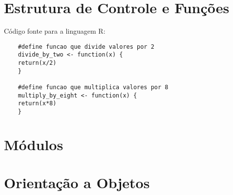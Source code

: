     \section{Estrutura de Controle e Fun\c{c}\~{o}es}
   C\'{o}digo fonte para a linguagem R:
    \begin{lstlisting}
    #define funcao que divide valores por 2
    divide_by_two <- function(x) {
    return(x/2)
    }

    #define funcao que multiplica valores por 8
    multiply_by_eight <- function(x) {
    return(x*8)
    }
    \end{lstlisting}



    \section{M\'{o}dulos}



    \section{Orienta\c{c}\~{a}o a Objetos}


